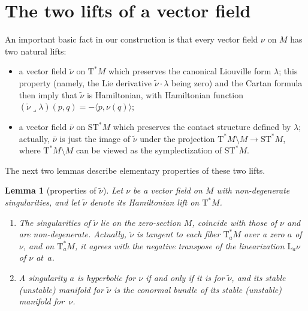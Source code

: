 \documentclass[10pt]{amsart}
\newenvironment{enumeratea}
{\bgroup\def\theenumi{\alph{enumi}}\begin{enumerate}}
{\end{enumerate}\egroup}
\newcommand{\tu}[1]{\textup{#1}}
\newcommand{\sT}{\mathrm{T}^\ast}
\newcommand{\sST}{\mathrm{ST}^\ast}
\newcommand{\hnu}{\tilde\nu}
\newcommand{\cnu}{\bar\nu}
\def\Lnu_#1{{\mathrm L_#1\nu}}
\newcommand{\prg}[1]{\langle #1 \rangle}
\newcommand{\hook}{\mathbin{\lrcorner}}
\theoremstyle{plain}
\newtheorem{lemma}[theorem]{Lemma}
\theoremstyle{definition}
\begin{document}
\section{The two lifts of a vector field} \label{s:lifts}

An important basic fact in our construction is that every vector field $\nu$ on
$M$ has two natural lifts:
\begin{itemize}
\item
a vector field $\hnu$ on $\sT M$ which preserves the canonical Liouville form
$\lambda$; this property (namely, the Lie derivative $\hnu \cdot \lambda$ being
zero) and the Cartan formula then imply that $\hnu$ is Hamiltonian, with
Hamiltonian function $(\hnu \hook \lambda)(p,q) = - \prg{p, \nu(q)}$;
\item
a vector field $\cnu$ on $\sST M$ which preserves the contact structure defined
by $\lambda$; actually, $\cnu$ is just the image of $\hnu$ under the projection
$\sT M \setminus M \to \sST M$, where $\sT M \setminus M$ can be viewed as the symplectization
of $\sST M$.
\end{itemize}
The next two lemmas describe elementary properties of these two lifts.

\begin{lemma}[properties of $\hnu$] \label{l:hnu}
Let $\nu$ be a vector field on $M$ with non-degenerate singularities, and let
$\hnu$ denote its Hamiltonian lift on $\sT M$.
\begin{enumeratea}
\item\label{l:hnua}
The singularities of $\hnu$ lie on the zero-section $M$, coincide with those of
$\nu$ and are non-degenerate. Actually, $\hnu$ is tangent to each fiber $\sT_aM$
over a zero $a$ of $\nu$, and on $\sT_aM$, it agrees with the negative transpose
of the linearization $\Lnu_a$ of $\nu$ at~$a$.

\item\label{l:hnub}
A singularity $a$ is hyperbolic for $\nu$ if and only if it is for $\hnu$, and
its stable \tu(\resp unstable\tu) manifold for $\hnu$ is the conormal bundle of
its stable \tu(\resp unstable\tu) manifold for~$\nu$.
\end{enumeratea}
\end{lemma}
\end{document}
